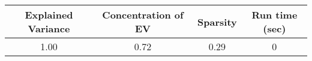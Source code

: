 \begin{tabular}{cccc}
\toprule
 Explained Variance &  Concentration of EV &  Sparsity & Run time (sec) \\
\midrule
               1.00 &                 0.72 &      0.29 &              0 \\
\bottomrule
\end{tabular}
